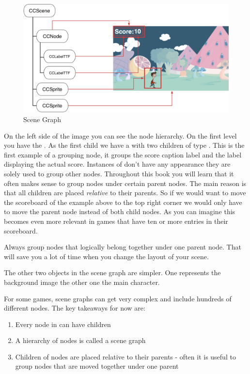 \begin{figure}[H]
		\centering
		\includegraphics[width=0.9\linewidth]{images/cocos2d/SceneGraph.png}     
		\caption{\cocos{} Scene Graph}
\end{figure}

On the left side of the image you can see the node hierarchy. On the first level
you have the \ccscene{}. As the first child we have a \ccnode{} with two
children of type \cclabel{}. This \ccnode{} is the first example of a grouping
node, it groups the score caption label and the label displaying the actual
score. Instances of \ccnode{} don't have any appearance they are solely used to
group other nodes. Throughout this book you will learn that it often makes sense
to group nodes under certain parent nodes. The main reason is that all children are placed
\textit{relative} to their parents. So if we would want to move the scoreboard
of the example above to the top right corner we would only have to move the
parent node instead of both child nodes. As you can imagine this becomes
even more relevant in games that have ten or more entries in their scoreboard.

\begin{bestpractice}[frametitle={Structuring Nodes}] 
Always group nodes that logically belong together under one parent node. That
will save you a lot of time when you change the layout of your scene.
\end{bestpractice}

The other two objects in the scene graph are simpler. One represents the
background image the other one the main character.

For some games, scene graphs can get very complex and include hundreds of
different nodes. The key takeaways for now are:

\begin{enumerate}
  \item Every node in \cocos{} can have children
  \item A hierarchy of nodes is called a scene graph
  \item Children of nodes are placed relative to their parents - often it is
  useful to group nodes that are moved together under one parent
\end{enumerate}

